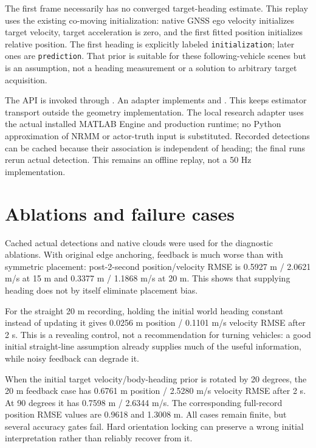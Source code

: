 \documentclass[11pt]{article}
\begin{document}
The first frame necessarily has no converged target-heading estimate.
This replay uses the existing co-moving initialization: native GNSS ego
velocity initializes target velocity, target acceleration is zero, and the
first fitted position initializes relative position. The first heading is
explicitly labeled \texttt{initialization}; later ones are \texttt{prediction}.
That prior is suitable for these following-vehicle scenes but is an assumption,
not a heading measurement or a solution to arbitrary target acquisition.

The API is invoked through .
An adapter implements 
and . This keeps estimator transport outside
the geometry implementation. The local research adapter uses the actual
installed MATLAB Engine and production runtime; no Python approximation of
NRMM or actor-truth input is substituted. Recorded detections can be cached
because their association is independent of heading; the final runs rerun
actual detection. This remains an offline replay, not a 50 Hz implementation.

\section{Ablations and failure cases}
Cached actual detections and native clouds were used for the diagnostic
ablations. With original edge anchoring, feedback is much worse than with
symmetric placement: post-2-second position/velocity RMSE is
0.5927 m / 2.0621 m/s at 15 m and 0.3377 m / 1.1868 m/s at 20 m.
This shows that supplying heading does not by itself eliminate placement bias.

For the straight 20 m recording, holding the initial world heading constant
instead of updating it gives 0.0256 m position / 0.1101 m/s velocity RMSE
after 2 s. This is a revealing control, not a recommendation for turning
vehicles: a good initial straight-line assumption already supplies much of
the useful information, while noisy feedback can degrade it.

When the initial target velocity/body-heading prior is rotated by 20 degrees,
the 20 m feedback case has 0.6761 m position / 2.5280 m/s velocity RMSE after
2 s. At 90 degrees it has 0.7598 m / 2.6344 m/s. The corresponding full-record
position RMSE values are 0.9618 and 1.3008 m. All cases remain finite, but
several accuracy gates fail. Hard orientation locking can preserve a wrong
initial interpretation rather than reliably recover from it.
\end{document}
